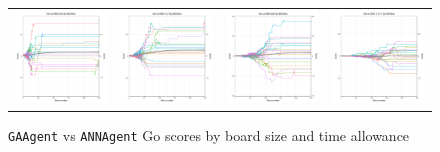 \begin{figure}
\begin{tabular}{cccc}
\hspace{-0.5cm}\includegraphics[width = 1.55in]{images/Visualizations/GAvsANN/8000ms5x5.png} &
\hspace{-0.5cm}\includegraphics[width = 1.55in]{images/Visualizations/GAvsANN/8000ms7x7.png} &
\hspace{-0.5cm}\includegraphics[width = 1.55in]{images/Visualizations/GAvsANN/8000ms9x9.png} &
\hspace{-0.5cm}\includegraphics[width = 1.55in]{images/Visualizations/GAvsANN/8000ms11x11.png} \\
\end{tabular}
\caption{\texttt{GAAgent} vs \texttt{ANNAgent} Go scores by board size and time allowance}
\label{app:gaannscore}
\end{figure}

